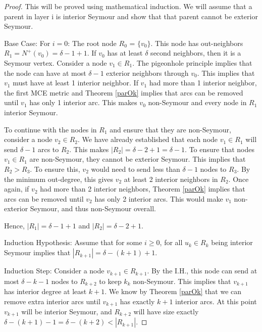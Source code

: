 \documentclass[AMS, Times1COL]{article} %
\theoremstyle{definition}
\begin{document}
	\begin{proof}
		This will be proved using mathematical induction. We will assume that a parent in layer i is interior Seymour and show that that parent cannot be exterior Seymour. 
		
		Base Case: For $i = 0$: 
		The root node $R_0$ = $\{v_0\}$.  
		This node has out-neighbors $R_1 = N^+(v_0) = \delta - 1 + 1$. 
		If $v_0$ has at least $\delta$ second neighbors, then it is a Seymour vertex. 
		Consider a node $v_1 \in R_1$. 
		The pigeonhole principle implies that the node can have at most $\delta-1$ exterior neighbors through $v_0$. 
		This implies that $v_1$ must have at least 1 interior neighbor. 
		If $v_1$ had more than 1 interior neighbor, the first MCE metric and Theorem \ref{parOk} implies that arcs can be removed until $v_1$ has only 1 interior arc. 
		This makes $v_0$ non-Seymour and every node in $R_1$ interior Seymour. 
		
		To continue with the nodes in $R_1$ and ensure that they are non-Seymour, consider a node $v_2 \in R_2$. 
		We have already established that each node $v_1 \in R_1$ will send $\delta - 1$ arcs to $R_2$. 
		This makes $|R_2| = \delta - 2 + 1 = \delta - 1$. 
		To ensure that nodes $v_1 \in R_1$ are non-Seymour, they cannot be exterior Seymour. 
		This implies that $R_2 > R_3$. 
		To ensure this, $v_2$ would need to send less than $\delta - 1$ nodes to $R_3$. 
		By the minimum out-degree, this gives $v_2$ at least 2 interior neighbors in $R_2$. 
		Once again, if $v_2$ had more than 2 interior neighbors, Theorem \ref{parOk} implies that arcs can be removed until $v_2$ has only 2 interior arcs. 
		This would make $v_1$ non-exterior Seymour, and thus non-Seymour overall. 
		
		Hence, $|R_1|=\delta -1+1$ and $|R_2| = \delta - 2 + 1$. 
		
		Induction Hypothesis: Assume that for some $i \geq 0$, for all $u_k \in R_k$ being interior Seymour implies that $|R_{k+1}| = \delta - (k+1) + 1$. 
		
		Induction Step: 
		Consider a node $v_{k+1} \in R_{k+1}$. By the I.H., this node can send at most $\delta - k - 1$ nodes to $R_{k+2}$ to keep $k_k$ non-Seymour. This implies that $v_{k+1}$ has interior degree at least $k+1$. We know by Theorem \ref{parOk} that we can remove extra interior arcs until $v_{k+1}$ has exactly $k+1$ interior arcs. At this point $v_{k+1}$ will be interior Seymour, and $R_{k+2}$ will have size exactly $\delta - (k+1) - 1 = \delta - (k + 2) < |R_{k+1}|$. 
	\end{proof}
	
\end{document}
